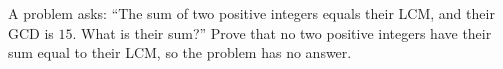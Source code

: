 A problem asks: ``The sum of two positive integers equals their LCM, and their GCD is $15$. What is their sum?'' Prove that no two positive integers have their sum equal to their LCM, so the problem has no answer.
